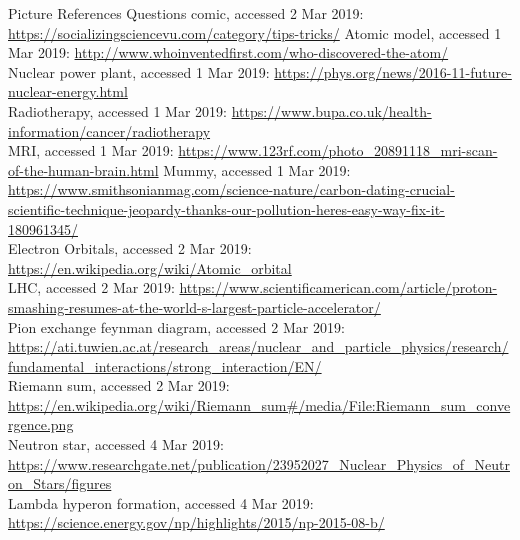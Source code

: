 \documentclass{beamer}
\begin{document}
\begin{frame}{Picture References}
\tiny
Questions comic, accessed 2 Mar 2019: \href{https://socializingsciencevu.com/category/tips-tricks/}{https://socializingsciencevu.com/category/tips-tricks/}
Atomic model, accessed 1 Mar 2019: \href{http://www.whoinventedfirst.com/who-discovered-the-atom/}{http://www.whoinventedfirst.com/who-discovered-the-atom/}\\
Nuclear power plant, accessed 1 Mar 2019: \href{https://phys.org/news/2016-11-future-nuclear-energy.html}{https://phys.org/news/2016-11-future-nuclear-energy.html}\\
Radiotherapy, accessed 1 Mar 2019: \href{https://www.bupa.co.uk/health-information/cancer/radiotherapy}{https://www.bupa.co.uk/health-information/cancer/radiotherapy}\\
MRI, accessed 1 Mar 2019: \href{https://www.123rf.com/photo_20891118_mri-scan-of-the-human-brain.html}{https://www.123rf.com/photo\_20891118\_mri-scan-of-the-human-brain.html}
Mummy, accessed 1 Mar 2019: \href{https://www.smithsonianmag.com/science-nature/carbon-dating-crucial-scientific-technique-jeopardy-thanks-our-pollution-heres-easy-way-fix-it-180961345/}{https://www.smithsonianmag.com/science-nature/carbon-dating-crucial-scientific-technique-jeopardy-thanks-our-pollution-heres-easy-way-fix-it-180961345/}\\
Electron Orbitals, accessed 2 Mar 2019: \href{https://en.wikipedia.org/wiki/Atomic_orbital}{https://en.wikipedia.org/wiki/Atomic\_orbital}\\
LHC, accessed 2 Mar 2019: \href{https://www.scientificamerican.com/article/proton-smashing-resumes-at-the-world-s-largest-particle-accelerator/}{https://www.scientificamerican.com/article/proton-smashing-resumes-at-the-world-s-largest-particle-accelerator/}\\
Pion exchange feynman diagram, accessed 2 Mar 2019: \href{https://ati.tuwien.ac.at/research_areas/nuclear_and_particle_physics/research/fundamental_interactions/strong_interaction/EN/}{https://ati.tuwien.ac.at/research\_areas/nuclear\_and\_particle\_physics/research/fundamental\_interactions/strong\_interaction/EN/}\\
Riemann sum, accessed 2 Mar 2019: \href{https://en.wikipedia.org/wiki/Riemann\_sum\#/media/File:Riemann\_sum\_convergence.png}{https://en.wikipedia.org/wiki/Riemann\_sum\#/media/File:Riemann\_sum\_convergence.png}\\
Neutron star, accessed 4 Mar 2019: \href{https://www.researchgate.net/publication/23952027_Nuclear_Physics_of_Neutron_Stars/figures}{https://www.researchgate.net/publication/23952027\_Nuclear\_Physics\_of\_Neutron\_Stars/figures}\\
Lambda hyperon formation, accessed 4 Mar 2019: \href{https://science.energy.gov/np/highlights/2015/np-2015-08-b/}{https://science.energy.gov/np/highlights/2015/np-2015-08-b/}\\
\end{frame}
\end{document}
